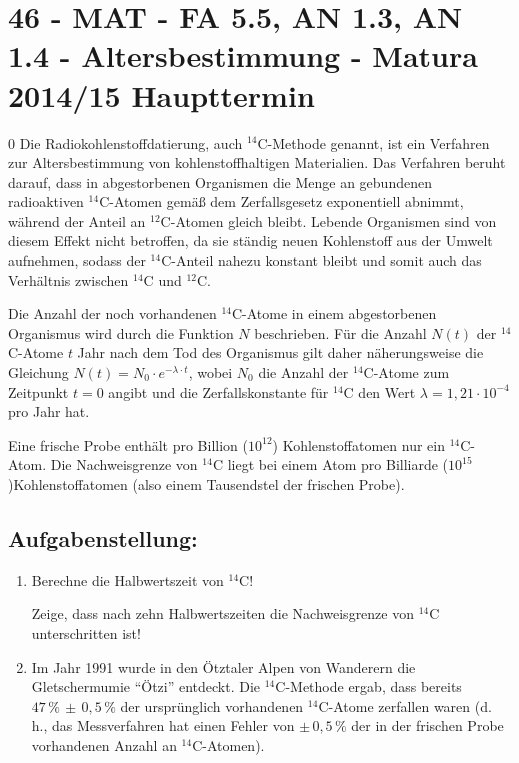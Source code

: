 \section{46 - MAT - FA 5.5, AN 1.3, AN 1.4 - Altersbestimmung - Matura 2014/15 Haupttermin}

\begin{langesbeispiel} \item[0] %
				 Die Radiokohlenstoffdatierung, auch $^{14}$C-Methode genannt, ist ein Verfahren zur Altersbestimmung von kohlenstoffhaltigen Materialien. Das Verfahren beruht darauf, dass in abgestorbenen Organismen die Menge an gebundenen radioaktiven $^{14}$C-Atomen gemäß dem Zerfallsgesetz exponentiell abnimmt, während der Anteil an $^{12}$C-Atomen gleich bleibt. Lebende Organismen sind von diesem Effekt nicht betroffen, da sie ständig neuen Kohlenstoff aus der Umwelt aufnehmen, sodass der $^{14}$C-Anteil nahezu konstant bleibt und somit auch das Verhältnis zwischen $^{14}$C und $^{12}$C.
				
			Die Anzahl der noch vorhandenen $^{14}$C-Atome in einem abgestorbenen Organismus wird durch die Funktion $N$ beschrieben. Für die Anzahl $N(t)$ der $^{14}$C-Atome $t$ Jahr nach dem Tod des Organismus gilt daher näherungsweise die Gleichung $N(t)=N_0\cdot e^{-\lambda\cdot t}$, wobei $N_0$ die Anzahl der $^{14}$C-Atome zum Zeitpunkt $t=0$ angibt und die Zerfallskonstante für $^{14}$C den Wert $\lambda=1,21\cdot 10^{-4}$ pro Jahr hat.
			
			Eine frische Probe enthält pro Billion ($10^{12}$) Kohlenstoffatomen nur ein $^{14}$C-Atom. Die Nachweisgrenze von $^{14}$C liegt bei einem Atom pro Billiarde ($10^{15}$)Kohlenstoffatomen (also einem Tausendstel der frischen Probe).


\subsection{Aufgabenstellung:}
\begin{enumerate}
	\item {} Berechne die Halbwertszeit von $^{14}$C!
	
	Zeige, dass nach zehn Halbwertszeiten die Nachweisgrenze von $^{14}$C unterschritten ist!

\item  Im Jahr 1991 wurde in den Ötztaler Alpen von Wanderern die Gletschermumie "`Ötzi"' entdeckt. Die $^{14}$C-Methode ergab, dass bereits $47\,\%\,\pm\,0,5\,\%$ der ursprünglich vorhandenen $^{14}$C-Atome zerfallen waren (d. h., das Messverfahren hat einen Fehler von $\pm\,0,5\,\%$ der in der frischen Probe vorhandenen Anzahl an $^{14}$C-Atomen). 


\end{enumerate}
\end{langesbeispiel}
